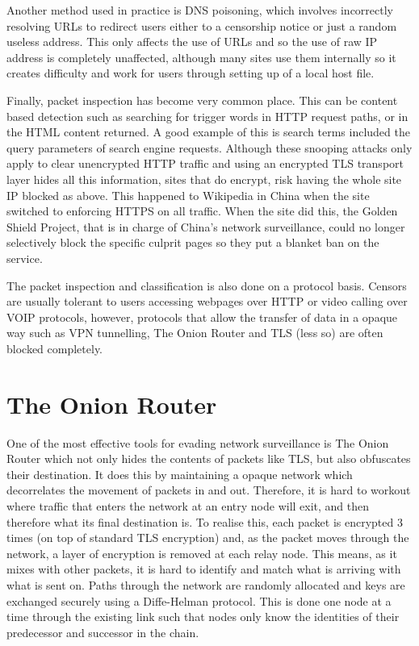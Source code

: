 \documentclass[10pt,a4paper]{article}
\begin{document}
Another method used in practice is DNS poisoning, which involves incorrectly resolving URLs to redirect users either to a censorship notice or just a random useless address. This only affects the use of URLs and so the use of raw IP address is completely unaffected, although many sites use them internally so it creates difficulty and work for users through setting up of a local host file.

Finally, packet inspection has become very common place. This can be content based detection such as searching for trigger words in HTTP request paths, or in the HTML content returned. A good example of this is search terms included the query parameters of  search engine requests. Although these snooping attacks only apply to clear unencrypted HTTP traffic and using an encrypted  TLS transport layer hides all this information, sites that do encrypt, risk having the whole site IP blocked as above. This happened to Wikipedia in China when the site switched to enforcing HTTPS on all traffic. When the site did this, the Golden Shield Project, that is in charge of China's network surveillance, could no longer selectively block the specific culprit pages so they put a blanket ban on the service.

The packet inspection and classification is also done on a protocol basis. Censors are usually tolerant to users accessing webpages over HTTP or video calling over VOIP protocols, however, protocols that allow the transfer of data in a opaque way such as VPN tunnelling, The Onion Router and TLS (less so) are often blocked completely.

\section{The Onion Router}

One of the most effective tools for evading network surveillance is The Onion Router which not only hides the contents of packets like TLS, but also obfuscates their destination. It does this by maintaining a opaque network which decorrelates the movement of packets in and out. Therefore, it is hard to workout where traffic that enters the network at an entry node will exit, and then therefore what its final destination is. To realise this, each packet is encrypted 3 times (on top of standard TLS encryption) and, as the packet moves through the network, a layer of encryption is removed at each relay node. This means, as it mixes with other packets, it is hard to identify and match what is arriving with what is sent on. Paths through the network are randomly allocated and keys are exchanged securely using a Diffe-Helman protocol. This is done one node at a time through the existing link such that nodes only know the identities of their predecessor and successor in the chain. 
\end{document}
